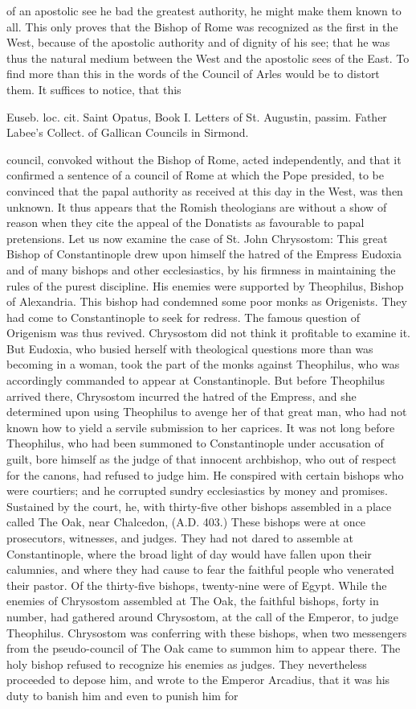of an apostolic see he bad the greatest authority, he might make them known to all. This only proves that the Bishop of Rome was recognized as the first in the West, because of the apostolic authority and of dignity of his see; that he was thus the natural medium between the West and the apostolic sees of the East. To find more than this in the words of the Council of Arles would be to distort them. It suffices to notice, that this

Euseb. loc. cit. Saint Opatus, Book I. Letters of St. Augustin, passim. Father Labee’s Collect. of Gallican Councils in Sirmond.

council, convoked without the Bishop of Rome, acted independently, and that it confirmed a sentence of a council of Rome at which the Pope presided, to be convinced that the papal authority as received at this day in the West, was then unknown. It thus appears that the Romish theologians are without a show of reason when they cite the appeal of the Donatists as favourable to papal pretensions. Let us now examine the case of St. John Chrysostom: This great Bishop of Constantinople drew upon himself the hatred of the Empress Eudoxia and of many bishops and other ecclesiastics, by his firmness in maintaining the rules of the purest discipline. His enemies were supported by Theophilus, Bishop of Alexandria. This bishop had condemned some poor monks as Origenists. They had come to Constantinople to seek for redress. The famous question of Origenism was thus revived. Chrysostom did not think it profitable to examine it. But Eudoxia, who busied herself with theological questions more than was becoming in a woman, took the part of the monks against Theophilus, who was accordingly commanded to appear at Constantinople. But before Theophilus arrived there, Chrysostom incurred the hatred of the Empress, and she determined upon using Theophilus to avenge her of that great man, who had not known how to yield a servile submission to her caprices. It was not long before Theophilus, who had been summoned to Constantinople under accusation of guilt, bore himself as the judge of that innocent archbishop, who out of respect for the canons, had refused to judge him. He conspired with certain bishops who were courtiers; and he corrupted sundry ecclesiastics by money and promises. Sustained by the court, he, with thirty-five other bishops assembled in a place called The Oak, near Chalcedon, (A.D. 403.) These bishops were at once prosecutors, witnesses, and judges. They had not dared to assemble at Constantinople, where the broad light of day would have fallen upon their calumnies, and where they had cause to fear the faithful people who venerated their pastor. Of the thirty-five bishops, twenty-nine were of Egypt. While the enemies of Chrysostom assembled at The Oak, the faithful bishops, forty in number, had gathered around Chrysostom, at the call of the Emperor, to judge Theophilus. Chrysostom was conferring with these bishops, when two messengers from the pseudo-council of The Oak came to summon him to appear there. The holy bishop refused to recognize his enemies as judges. They nevertheless proceeded to depose him, and wrote to the Emperor Arcadius, that it was his duty to banish him and even to punish him for 